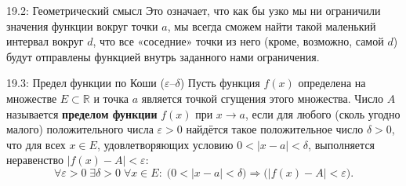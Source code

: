 \documentclass[a4paper,12pt]{article}
\begin{document}
	\begin{notebook}{19.2: Геометрический смысл}
		Это означает, что как бы узко мы ни ограничили значения функции вокруг точки $a$, мы всегда сможем найти такой маленький интервал вокруг $d$, что все «соседние» точки из него (кроме, возможно, самой $d$) будут отправлены функцией внутрь заданного нами ограничения.
	\end{notebook}
	
	\begin{definitionbox}{19.3: Предел функции по Коши ($\varepsilon$–$\delta$)}
		Пусть функция $f(x)$ определена на множестве $E \subset \mathbb{R}$ и точка $a$ является точкой сгущения этого множества. Число $A$ называется \textbf{пределом функции} $f(x)$ при $x \to a$, если для любого (сколь угодно малого) положительного числа $\varepsilon > 0$ найдётся такое положительное число $\delta > 0$, что для всех $x \in E$, удовлетворяющих условию $0 < |x - a| < \delta$, выполняется неравенство $|f(x) - A| < \varepsilon$:
		\[
		\forall \varepsilon > 0 \; \exists \delta > 0 \; \forall x \in E: \; \big( 0 < |x - a| < \delta \big) \Rightarrow \big( |f(x) - A| < \varepsilon \big).
		\]
	\end{definitionbox}
		
\end{document}
